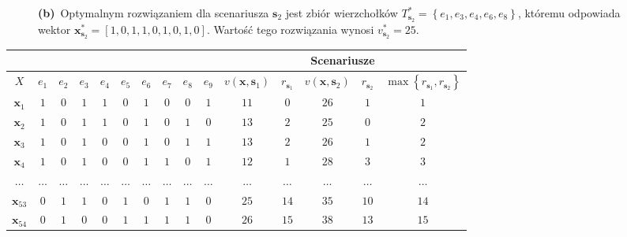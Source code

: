 \begin{figure}[!htbp]
{		\textbf{(b)}~Optymalnym rozwiązaniem dla scenariusza $\textbf{s}_{2}$ jest zbiór wierzchołków $T^{\ast}_{\textbf{s}_{2}} = \left\{ e_{1}, e_{3}, e_{4}, e_{6}, e_{8} \right\}$, któremu odpowiada wektor $\textbf{x}^{\ast}_{\textbf{s}_{2}} = \left[ 1, 0, 1, 1, 0, 1, 0, 1, 0 \right]$. Wartość tego rozwiązania wynosi $v^{\ast}_{\textbf{s}_{2}} = 25$.
	}
	\label{fig:minmaxregexample}
\end{figure}

\begin{table}[!htbp]
	\centering
	\begin{tabular}{ccccccccccccccc}
		\cline{11-15}
		\multicolumn{2}{c}{}       &         &         &         &         &         &         &         &         & \multicolumn{5}{c}{Scenariusze}                                                                                                                                                                                             \\ \hline
		$X$              & $e_{1}$ & $e_{2}$ & $e_{3}$ & $e_{4}$ & $e_{5}$ & $e_{6}$ & $e_{7}$ & $e_{8}$ & $e_{9}$ & $v \left( \textbf{x}, \textbf{s}_{1} \right) $ & $r_{\textbf{s}_{1}}$  & $v \left( \textbf{x}, \textbf{s}_{2} \right) $ &  $r_{\textbf{s}_{2}}$ & $\max \left\{ r_{\textbf{s}_{1}}, r_{\textbf{s}_{2}} \right\} $ \\ \hline
		$\textbf{x}_{1}$ & $1$     & $0$     & $1$     & $1$     & $0$     & $1$     & $0$     & $0$	&	$1$	&	$11$	&	$0$	&	$26$	&	$1$	&	$1$	\\
		$\textbf{x}_{2}$ & $1$     & $0$     & $1$     & $1$     & $0$     & $1$     & $0$     & $1$	&	$0$	&	$13$	&	$2$	&	$25$	&	$0$	&	$2$	\\
		$\textbf{x}_{3}$ & $1$     & $0$     & $1$     & $0$     & $0$     & $1$     & $0$     & $1$	&	$1$	&	$13$	&	$2$	&	$26$	&	$1$	&	$2$	\\
		$\textbf{x}_{4}$ & $1$     & $0$     & $1$     & $0$     & $0$     & $1$     & $1$     & $0$	&	$1$	&	$12$	&	$1$	&	$28$	&	$3$	&	$3$	\\
		$\dots$ & $\dots$     & $\dots$     & $\dots$     & $\dots$     & $\dots$     & $\dots$     & $\dots$     & $\dots$	&	$\dots$	&	$\dots$	&	$\dots$	&	$\dots$	&	$\dots$	&	$\dots$	\\
		$\textbf{x}_{53}$ & $0$     & $1$     & $1$     & $0$     & $1$     & $0$     & $1$     & $1$	&	$0$	&	$25$	&	$14$	&	$35$	&	$10$	&	$14$	\\
		$\textbf{x}_{54}$ & $0$     & $1$     & $0$     & $0$     & $1$     & $1$     & $1$     & $1$	&	$0$	&	$26$	&	$15$	&	$38$	&	$13$	&	$15$	\\

\end{tabular}
\end{table}
